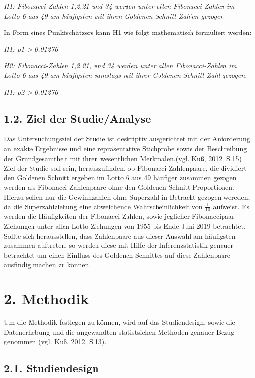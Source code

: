 \documentclass[ngerman,]{article}
\begin{document}
\emph{H1: Fibonacci-Zahlen 1,2,21 und 34 werden unter allen
Fibonacci-Zahlen im Lotto 6 aus 49 am häufigsten mit ihren Goldenen
Schnitt Zahlen gezogen}

In Form eines Punktschätzers kann H1 wie folgt mathematisch formuliert
werden:

\emph{H1: p1 \textgreater{} 0.01276}

\emph{H2: Fibonacci-Zahlen 1,2,21, und 34 werden unter allen
Fibonacci-Zahlen im Lotto 6 aus 49 am häufigsten samstags mit ihrer
Goldenen Schnitt Zahl gezogen.}

\emph{H1: p2 \textgreater{} 0.01276}

\subsection{1.2. Ziel der Studie/Analyse}\label{ziel-der-studieanalyse}

Das Untersuchungsziel der Studie ist deskriptiv ausgerichtet mit der
Anforderung an exakte Ergebnisse und eine repräsentative Stichprobe
sowie der Beschreibung der Grundgesamtheit mit ihren wesentlichen
Merkmalen.(vgl. Kuß, 2012, S.15) Ziel der Studie soll sein,
herauszufinden, ob Fibonacci-Zahlenpaare, die dividiert den Goldenen
Schnitt ergeben im Lotto 6 aus 49 häufiger zusammen gezogen werden als
Fibonacci-Zahlenpaare ohne den Goldenen Schnitt Proportionen. Hierzu
sollen nur die Gewinnzahlen ohne Superzahl in Betracht gezogen wereden,
da die Superzahlziehung eine abweichende Wahrscheinlichkeit von
\(\frac{1}{10}\) aufweist. Es werden die Häufigkeiten der
Fibonacci-Zahlen, sowie jeglicher Fibonaccipaar-Ziehungen unter allen
Lotto-Ziehungen von 1955 bis Ende Juni 2019 betrachtet. Sollte sich
herausstellen, dass Zahlenpaare aus dieser Auswahl am häufigsten
zusammen auftreten, so werden diese mit Hilfe der Inferenzstatistik
genauer betrachtet um einen Einfluss des Goldenen Schnittes auf diese
Zahlenpaare ausfindig machen zu können.

\section{2. Methodik}\label{methodik}

Um die Methodik festlegen zu können, wird auf das Studiendesign, sowie
die Datenerhebung und die angewandten statistsichen Methoden genauer
Bezug genommen (vgl. Kuß, 2012, S.13).

\subsection{2.1. Studiendesign}\label{studiendesign}
\end{document}
